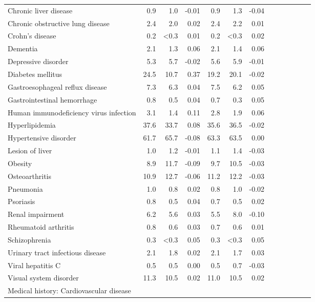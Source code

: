 \documentclass[11pt,]{article}
\begin{document}
\begin{longtable}{lrrrrrrrrrrrr}
      Chronic liver disease &  0.9 &  1.0 & -0.01 &  0.9 &  1.3 & -0.04 \\ 
      Chronic obstructive lung disease &  2.4 &  2.0 &  0.02 &  2.4 &  2.2 &  0.01 \\ 
      Crohn's disease &  0.2 & <0.3 &  0.01 &  0.2 & <0.3 &  0.02 \\ 
      Dementia &  2.1 &  1.3 &  0.06 &  2.1 &  1.4 &  0.06 \\ 
      Depressive disorder &  5.3 &  5.7 & -0.02 &  5.6 &  5.9 & -0.01 \\ 
      Diabetes mellitus & 24.5 & 10.7 &  0.37 & 19.2 & 20.1 & -0.02 \\ 
      Gastroesophageal reflux disease &  7.3 &  6.3 &  0.04 &  7.5 &  6.2 &  0.05 \\ 
      Gastrointestinal hemorrhage &  0.8 &  0.5 &  0.04 &  0.7 &  0.3 &  0.05 \\ 
      Human immunodeficiency virus infection &  3.1 &  1.4 &  0.11 &  2.8 &  1.9 &  0.06 \\ 
      Hyperlipidemia & 37.6 & 33.7 &  0.08 & 35.6 & 36.5 & -0.02 \\ 
      Hypertensive disorder & 61.7 & 65.7 & -0.08 & 63.3 & 63.5 &  0.00 \\ 
      Lesion of liver &  1.0 &  1.2 & -0.01 &  1.1 &  1.4 & -0.03 \\ 
      Obesity &  8.9 & 11.7 & -0.09 &  9.7 & 10.5 & -0.03 \\ 
      Osteoarthritis & 10.9 & 12.7 & -0.06 & 11.2 & 12.2 & -0.03 \\ 
      Pneumonia &  1.0 &  0.8 &  0.02 &  0.8 &  1.0 & -0.02 \\ 
      Psoriasis &  0.8 &  0.5 &  0.04 &  0.7 &  0.5 &  0.02 \\ 
      Renal impairment &  6.2 &  5.6 &  0.03 &  5.5 &  8.0 & -0.10 \\ 
      Rheumatoid arthritis &  0.8 &  0.6 &  0.03 &  0.7 &  0.6 &  0.01 \\ 
      Schizophrenia &  0.3 & <0.3 &  0.05 &  0.3 & <0.3 &  0.05 \\ 
      Urinary tract infectious disease &  2.1 &  1.8 &  0.02 &  2.1 &  1.7 &  0.03 \\ 
      Viral hepatitis C &  0.5 &  0.5 &  0.00 &  0.5 &  0.7 & -0.03 \\ 
      Visual system disorder & 11.3 & 10.5 &  0.02 & 11.0 & 10.5 &  0.02 \\ 
  Medical history: Cardiovascular disease &    &    &     &    &    &     \\ 

\end{longtable}
\end{document}
